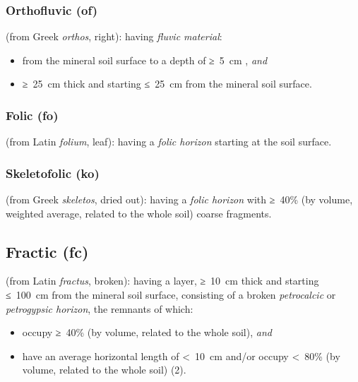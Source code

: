\documentclass[
  letterpaper,
  DIV=11,
  numbers=noendperiod]{scrreprt}
\providecommand{\tightlist}{%
  \setlength{\itemsep}{0pt}\setlength{\parskip}{0pt}}\usepackage{longtable,booktabs,array}
\begin{document}
\hypertarget{orthofluvic-of}{%
\subsubsection{Orthofluvic (of)}\label{orthofluvic-of}}

(from Greek \emph{orthos}, right): having \emph{fluvic material}:

\begin{itemize}
\tightlist
\item
  from the mineral soil surface to a depth of ≥~5~cm , \emph{and}
\item
  ≥~25~cm thick and starting ≤~25~cm from the mineral soil surface.
\end{itemize}

\hypertarget{folic-fo}{%
\subsubsection{Folic (fo)}\label{folic-fo}}

(from Latin \emph{folium}, leaf): having a \emph{folic horizon} starting
at the soil surface.

\hypertarget{skeletofolic-ko}{%
\subsubsection{Skeletofolic (ko)}\label{skeletofolic-ko}}

(from Greek \emph{skeletos}, dried out): having a \emph{folic horizon}
with ≥~40\% (by volume, weighted average, related to the whole soil)
coarse fragments.

\hypertarget{fractic-fc}{%
\subsection{Fractic (fc)}\label{fractic-fc}}

(from Latin \emph{fractus}, broken): having a layer, ≥~10~cm thick and
starting ≤~100~cm from the mineral soil surface, consisting of a broken
\emph{petrocalcic} or \emph{petrogypsic horizon}, the remnants of which:

\begin{itemize}
\tightlist
\item
  occupy ≥~40\% (by volume, related to the whole soil), \emph{and}
\item
  have an average horizontal length of \textless~10~cm and/or occupy
  \textless~80\% (by volume, related to the whole soil) (2).
\end{itemize}
\end{document}
